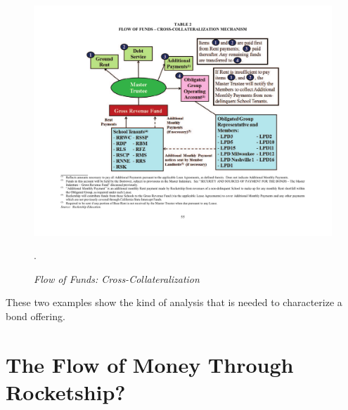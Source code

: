 \begin{figure}[hbt]
  \centering
  \caption[Flow of Funds: Cross-Collateralization]{\textit{Flow of Funds: Cross-Collateralization}}\label{fig:flow_of_funds_cross-collateralization}
  \includegraphics[width=\textwidth]{Flow_of_Funds_Cross-Collateralization}\\
  \footnotesize\raggedright\textcite[55]{CSFA2017}.
\end{figure}

These two examples show the kind of analysis that is needed to characterize a bond offering.


\section{The Flow of Money Through Rocketship?}\label{sec:flows-of-money}\indent

